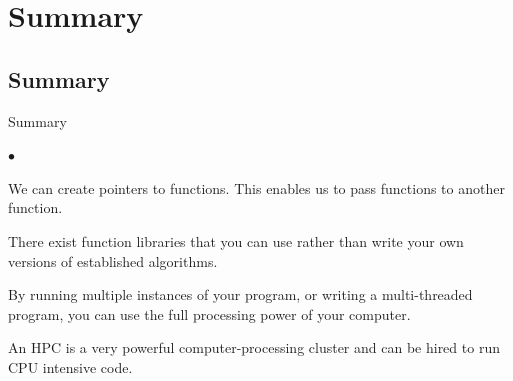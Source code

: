 \documentclass[smaller,handout,table]{beamer}
\begin{document}
\section{Summary}
\subsection{Summary}
\begin{frame}{Summary}
\begin{list}{$\bullet$}{}
\item We can create pointers to functions. This enables us to pass functions to another function.
\item There exist function libraries that you can use rather than write your own versions of established algorithms.
\item By running multiple instances of your program, or writing a multi-threaded program, you can use the full processing power of your computer.
\item An HPC is a very powerful computer-processing cluster and can be hired to run CPU intensive code.
\end{list}
\end{frame}
\end{document}
